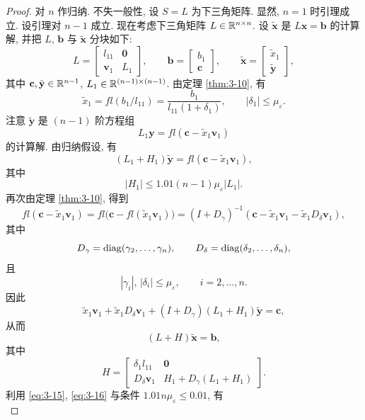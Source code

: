\begin{proof}
对 $n$ 作归纳. 不失一般性, 设 $S=L$ 为下三角矩阵. 显然, $n=1$ 时引理成立. 设引理对 $n-1$ 成立. 现在考虑下三角矩阵 $L\in\mathbb{R}^{n\times n}$. 设 $\tilde{\mathbf{x}}$ 是 $L\mathbf{x}=\mathbf{b}$ 的计算解, 并把 $L$, $\mathbf{b}$ 与 $\tilde{\mathbf{x}}$ 分块如下:
\[
  L=
  \begin{bmatrix}
    l_{11} & \mathbf{0}\\
    \mathbf{v}_1 & L_1
  \end{bmatrix},
  \qquad
  \mathbf{b}=
  \begin{bmatrix}
    b_1\\ \mathbf{c}
  \end{bmatrix},
  \qquad
  \tilde{\mathbf{x}}=
  \begin{bmatrix}
    \tilde{x}_1\\ \tilde{\mathbf{y}}
  \end{bmatrix},
\]
其中 $\mathbf{c},\tilde{\mathbf{y}}\in\mathbb{R}^{n-1}$, $L_1\in\mathbb{R}^{(n-1)\times(n-1)}$. 由定理 \ref{thm:3-10}, 有
\begin{equation}
  \tilde{x}_1=fl(b_1/l_{11})=\frac{b_1}{l_{11}(1+\delta_1)},
  \qquad|\delta_1|\leqslant\mu_\varepsilon.
  \label{eq:3-15}
\end{equation}
注意 $\tilde{\mathbf{y}}$ 是 $(n-1)$ 阶方程组
\[
  L_1\mathbf{y}=fl(\mathbf{c}-\tilde{x}_1\mathbf{v}_1)
\]
的计算解. 由归纳假设, 有
\[
  (L_1+H_1)\tilde{\mathbf{y}}=fl(\mathbf{c}-\tilde{x}_1\mathbf{v}_1),
\]
其中
\begin{equation}
  |H_1|\leqslant1.01(n-1)\mu_\varepsilon|L_1|.
  \label{eq:3-16}
\end{equation}
再次由定理 \ref{thm:3-10}, 得到
\[
  fl(\mathbf{c}-\tilde{x}_1\mathbf{v}_1)
  =fl\bigl(\mathbf{c}-fl(\tilde{x}_1\mathbf{v}_1)\bigr)
  =(I+D_\gamma)^{-1}(\mathbf{c}-\tilde{x}_1\mathbf{v}_1-\tilde{x}_1D_\delta\mathbf{v}_1),
\]
其中
\[
  D_\gamma=\operatorname{diag}(\gamma_2,\ldots,\gamma_n),\qquad
  D_\delta=\operatorname{diag}(\delta_2,\ldots,\delta_n),
\]
且
\[
  |\gamma_i|,\,|\delta_i|\leqslant\mu_\varepsilon,\qquad i=2,\ldots,n.
\]
因此
\[
  \tilde{x}_1\mathbf{v}_1+\tilde{x}_1D_\delta\mathbf{v}_1
  +(I+D_\gamma)(L_1+H_1)\tilde{\mathbf{y}}=\mathbf{c},
\]
从而
\[
  (L+H)\tilde{\mathbf{x}}=\mathbf{b},
\]
其中
\[
  H=
  \begin{bmatrix}
    \delta_1l_{11} & \mathbf{0}\\
    D_\delta\mathbf{v}_1 & H_1+D_\gamma(L_1+H_1)
  \end{bmatrix}.
\]
利用 \eqref{eq:3-15}, \eqref{eq:3-16} 与条件 $1.01n\mu_\varepsilon\leqslant0.01$, 有
\[
\]
\end{proof}
